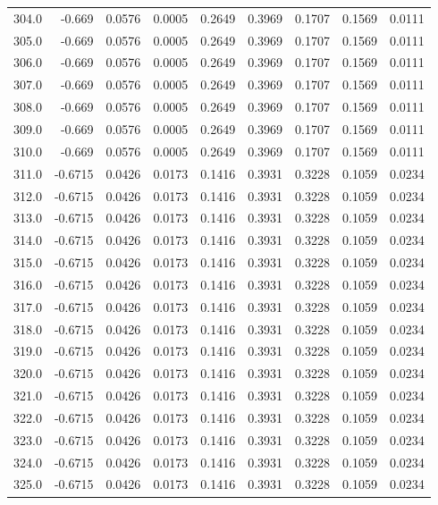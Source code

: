\begin{longtable}{lrrrrrrrr}
304.0 & -0.669 & 0.0576 & 0.0005 & 0.2649 & 0.3969 & 0.1707 & 0.1569 & 0.0111 \\
305.0 & -0.669 & 0.0576 & 0.0005 & 0.2649 & 0.3969 & 0.1707 & 0.1569 & 0.0111 \\
306.0 & -0.669 & 0.0576 & 0.0005 & 0.2649 & 0.3969 & 0.1707 & 0.1569 & 0.0111 \\
307.0 & -0.669 & 0.0576 & 0.0005 & 0.2649 & 0.3969 & 0.1707 & 0.1569 & 0.0111 \\
308.0 & -0.669 & 0.0576 & 0.0005 & 0.2649 & 0.3969 & 0.1707 & 0.1569 & 0.0111 \\
309.0 & -0.669 & 0.0576 & 0.0005 & 0.2649 & 0.3969 & 0.1707 & 0.1569 & 0.0111 \\
310.0 & -0.669 & 0.0576 & 0.0005 & 0.2649 & 0.3969 & 0.1707 & 0.1569 & 0.0111 \\
311.0 & -0.6715 & 0.0426 & 0.0173 & 0.1416 & 0.3931 & 0.3228 & 0.1059 & 0.0234 \\
312.0 & -0.6715 & 0.0426 & 0.0173 & 0.1416 & 0.3931 & 0.3228 & 0.1059 & 0.0234 \\
313.0 & -0.6715 & 0.0426 & 0.0173 & 0.1416 & 0.3931 & 0.3228 & 0.1059 & 0.0234 \\
314.0 & -0.6715 & 0.0426 & 0.0173 & 0.1416 & 0.3931 & 0.3228 & 0.1059 & 0.0234 \\
315.0 & -0.6715 & 0.0426 & 0.0173 & 0.1416 & 0.3931 & 0.3228 & 0.1059 & 0.0234 \\
316.0 & -0.6715 & 0.0426 & 0.0173 & 0.1416 & 0.3931 & 0.3228 & 0.1059 & 0.0234 \\
317.0 & -0.6715 & 0.0426 & 0.0173 & 0.1416 & 0.3931 & 0.3228 & 0.1059 & 0.0234 \\
318.0 & -0.6715 & 0.0426 & 0.0173 & 0.1416 & 0.3931 & 0.3228 & 0.1059 & 0.0234 \\
319.0 & -0.6715 & 0.0426 & 0.0173 & 0.1416 & 0.3931 & 0.3228 & 0.1059 & 0.0234 \\
320.0 & -0.6715 & 0.0426 & 0.0173 & 0.1416 & 0.3931 & 0.3228 & 0.1059 & 0.0234 \\
321.0 & -0.6715 & 0.0426 & 0.0173 & 0.1416 & 0.3931 & 0.3228 & 0.1059 & 0.0234 \\
322.0 & -0.6715 & 0.0426 & 0.0173 & 0.1416 & 0.3931 & 0.3228 & 0.1059 & 0.0234 \\
323.0 & -0.6715 & 0.0426 & 0.0173 & 0.1416 & 0.3931 & 0.3228 & 0.1059 & 0.0234 \\
324.0 & -0.6715 & 0.0426 & 0.0173 & 0.1416 & 0.3931 & 0.3228 & 0.1059 & 0.0234 \\
325.0 & -0.6715 & 0.0426 & 0.0173 & 0.1416 & 0.3931 & 0.3228 & 0.1059 & 0.0234 \\

\end{longtable}
